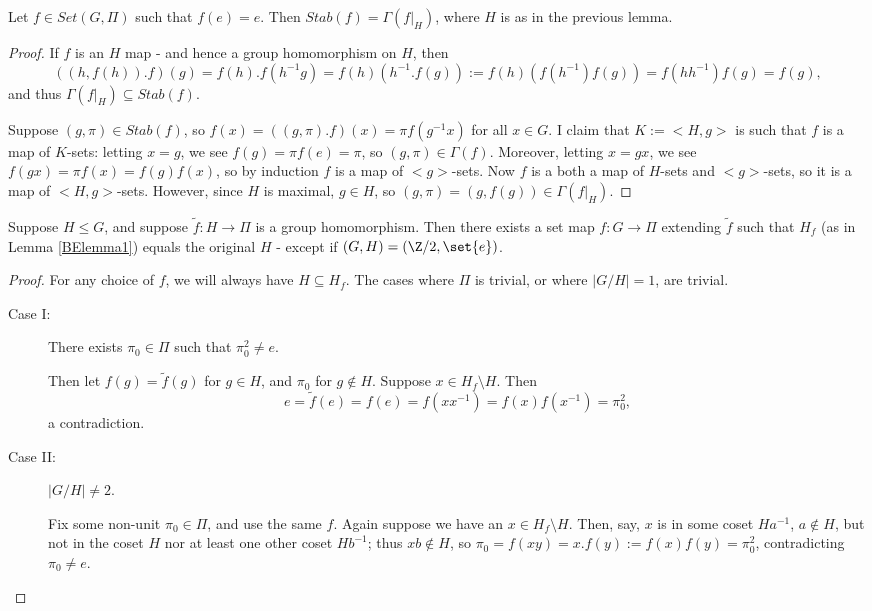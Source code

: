 \documentclass{report}
\begin{document}
\begin{appendices}
\begin{lemma}
\label{BElemma2}
  Let $f\in Set(G,\Pi)$ such that $f(e) = e$. Then $Stab(f) = \Gamma(f|_H)$, where $H$ is as in the previous lemma.
\end{lemma}
\begin{proof}
  If $f$ is an $H$ map - and hence a group homomorphism on $H$, then 
\[((h,f(h)).f)(g) = f(h).f(h^{-1}g) = f(h)(h^{-1}.f(g)) := f(h)(f(h^{-1})f(g)) = f(hh^{-1})f(g) = f(g),\]
and thus $\Gamma(f|_H) \subseteq Stab(f)$. 

Suppose $(g,\pi)\in Stab(f)$, so $f(x) = ((g,\pi).f)(x) = \pi f(g^{-1}x)$ for all $x\in G$. I claim that $K:= <H,g>$ is such that $f$ is a map of $K$-sets: letting $x = g$, we see $f(g) = \pi f(e) = \pi$, so $(g,\pi)\in \Gamma(f)$. Moreover, letting $x = gx$, we see $f(gx) = \pi f(x) = f(g)f(x)$, so by induction $f$ is a map of $<g>$-sets. Now $f$ is a both a map of $H$-sets and $<g>$-sets, so it is a map of $<H,g>$-sets. However, since $H$ is maximal, $g\in H$, so $(g,\pi) = (g,f(g))\in \Gamma(f|_H)$.
\end{proof}

\begin{lemma}
\label{BElemma3}
Suppose $H\leq G$, and suppose $\tilde f: H\to \Pi$ is a group homomorphism. Then there exists a set map $f: G\to \Pi$ extending $\tilde f$ such that $H_f$ (as in Lemma \ref{BElemma1}) equals the original $H$ - except if $(G,H) = (\Z/2, \set{e})$. 
\end{lemma}
\begin{proof}
  For any choice of $f$, we will always have $H\subseteq H_f$. The cases where $\Pi$ is trivial, or where $|G/H| = 1$, are trivial.
  \begin{description}
  \item[Case I:] There exists $\pi_0\in \Pi$ such that $\pi_0^2\neq e$. 

    Then let $f(g) = \tilde f(g)$ for $g\in H$, and $\pi_0$ for $g\not\in H$. Suppose $x\in H_f\setminus H$. Then
\[e = \tilde f(e) = f(e) = f(xx^{-1}) = f(x)f(x^{-1}) = \pi_0^2,\]
a contradiction.

\item[Case II:] $|G/H|\neq 2$. 

  Fix some non-unit $\pi_0\in \Pi$, and use the same $f$. Again suppose we have an $x\in H_f\setminus H$. Then, say, $x$ is in some coset $Ha^{-1}$, $a\notin H$, but not in the coset $H$ nor at least one other coset $Hb^{-1}$; thus $xb \notin H$, so $\pi_0 = f(xy) = x.f(y):= f(x)f(y) = \pi_0^2$, contradicting $\pi_0\neq e$.


\end{description}
\end{proof}
\end{appendices}
\end{document}
